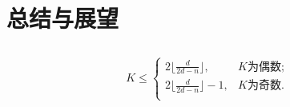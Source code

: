 \chapter{总结与展望}



\section{}

\begin{equation}
  K \leq 
  \left\{ 
    \begin{array}{cl}
      2 \lfloor \frac{d}{2d - n} \rfloor    , & K \text{为偶数} ; \\
      2 \lfloor \frac{d}{2d - n} \rfloor - 1, & K \text{为奇数}. \\
    \end{array}
  \right. 
\end{equation}